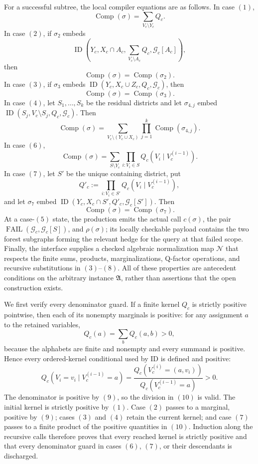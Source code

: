 For a successful subtree, the local compiler equations are as follows.  In case \((1)\),
\[
 \operatorname{Comp}(\sigma)=\sum_{V_c\setminus Y_c}Q_c.
 \tag{3}
\]
In case \((2)\), if \(\sigma_2\) embeds
\[
 \operatorname{ID}\!\left(
 Y_c,X_c\cap A_c,
 \sum_{V_c\setminus A_c}Q_c,
 \mathcal G_c[A_c]
 \right),
\]
then
\[
 \operatorname{Comp}(\sigma)=\operatorname{Comp}(\sigma_2).
 \tag{4}
\]
In case \((3)\), if \(\sigma_3\) embeds
\(\operatorname{ID}(Y_c,X_c\cup Z_c,Q_c,\mathcal G_c)\), then
\[
 \operatorname{Comp}(\sigma)=\operatorname{Comp}(\sigma_3).
 \tag{5}
\]
In case \((4)\), let \(S_1,\ldots,S_k\) be the residual districts and let \(\sigma_{4,j}\) embed
\(\operatorname{ID}(S_j,V_c\setminus S_j,Q_c,\mathcal G_c)\).  Then
\[
 \operatorname{Comp}(\sigma)
 =\sum_{V_c\setminus(Y_c\cup X_c)}
   \prod_{j=1}^{k}\operatorname{Comp}(\sigma_{4,j}).
 \tag{6}
\]
In case \((6)\),
\[
 \operatorname{Comp}(\sigma)
 =\sum_{S\setminus Y_c}
   \prod_{i:V_i\in S}Q_c(V_i\mid V_c^{(i-1)}).
 \tag{7}
\]
In case \((7)\), let \(S'\) be the unique containing district, put
\[
 Q'_c:=\prod_{i:V_i\in S'}Q_c(V_i\mid V_c^{(i-1)}),
\]
and let \(\sigma_7\) embed
\(\operatorname{ID}(Y_c,X_c\cap S',Q'_c,\mathcal G_c[S'])\).  Then
\[
 \operatorname{Comp}(\sigma)=\operatorname{Comp}(\sigma_7).
 \tag{8}
\]
At a case-\((5)\) state, the production emits the actual call \(c(\sigma)\), the pair
\(\operatorname{FAIL}(\mathcal G_c,\mathcal G_c[S])\), and \(\rho(\sigma)\); its locally checkable payload contains the two forest subgraphs forming the relevant hedge for the query at that failed scope.  Finally, the interface supplies a checked algebraic normalization map \(\mathcal N\) that respects the finite sums, products, marginalizations, Q-factor operations, and recursive substitutions in \((3)\)--\((8)\).  All of these properties are antecedent conditions on the arbitrary instance \(\mathfrak A\), rather than assertions that the open construction exists.

We first verify every denominator guard.  If a finite kernel \(Q_c\) is strictly positive pointwise, then each of its nonempty marginals is positive: for any assignment \(a\) to the retained variables,
\[
 Q_c(a)=\sum_b Q_c(a,b)>0,
 \tag{9}
\]
because the alphabets are finite and nonempty and every summand is positive.  Hence every ordered-kernel conditional used by ID is defined and positive:
\[
 Q_c(V_i=v_i\mid V_c^{(i-1)}=a)
 =\frac{Q_c(V_c^{(i)}=(a,v_i))}
 {Q_c(V_c^{(i-1)}=a)}>0.
 \tag{10}
\]
The denominator is positive by \((9)\), so the division in \((10)\) is valid.  The initial kernel is strictly positive by \((1)\).  Case \((2)\) passes to a marginal, positive by \((9)\); cases \((3)\) and \((4)\) retain the current kernel; and case \((7)\) passes to a finite product of the positive quantities in \((10)\).  Induction along the recursive calls therefore proves that every reached kernel is strictly positive and that every denominator guard in cases \((6)\), \((7)\), or their descendants is discharged.


